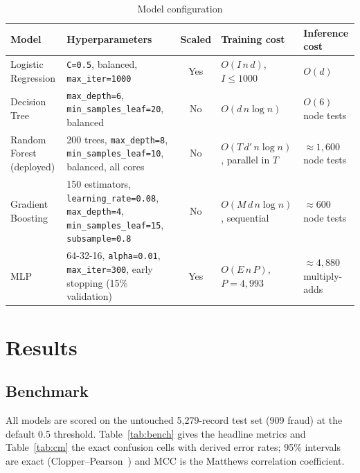 \documentclass[conference]{IEEEtran}
\newcommand{\tabfont}{\footnotesize}
\begin{document}
\begin{table}[!t]
\caption{Model configuration}\label{tab:models}
\centering\tabfont
\begin{tabularx}{\textwidth}{@{}l Y c Y Y@{}}
\toprule
\textbf{Model} & \textbf{Hyperparameters} & \textbf{Scaled} & \textbf{Training cost} & \textbf{Inference cost}\\
\midrule
Logistic Regression & \texttt{C=0.5}, balanced, \texttt{max\_\allowbreak{}iter=1000} & Yes & $O(I\,n\,d)$, $I\le1000$ & $O(d)$\\
Decision Tree & \texttt{max\_\allowbreak{}depth=6}, \texttt{min\_\allowbreak{}samples\_\allowbreak{}leaf=20}, balanced & No & $O(d\,n\log n)$ & $O(6)$ node tests\\
Random Forest (deployed) & 200 trees, \texttt{max\_\allowbreak{}depth=8}, \texttt{min\_\allowbreak{}samples\_\allowbreak{}leaf=10}, balanced, all cores & No & $O(T\,d'\,n\log n)$, parallel in $T$ & $\approx1{,}600$ node tests\\
Gradient Boosting & 150 estimators, \texttt{learning\_\allowbreak{}rate=0.08}, \texttt{max\_\allowbreak{}depth=4}, \texttt{min\_\allowbreak{}samples\_\allowbreak{}leaf=15}, \texttt{subsample=0.8} & No & $O(M\,d\,n\log n)$, sequential & $\approx600$ node tests\\
MLP & 64-32-16, \texttt{alpha=0.01}, \texttt{max\_\allowbreak{}iter=300}, early stopping (15\% validation) & Yes & $O(E\,n\,P)$, $P=4{,}993$ & $\approx4{,}880$ multiply-adds\\
\bottomrule
\end{tabularx}
\end{table}

\section{Results}
\subsection{Benchmark}
All models are scored on the untouched 5,279-record test set (909 fraud) at the default 0.5 threshold. Table~\ref{tab:bench} gives the headline metrics and Table~\ref{tab:cm} the exact confusion cells with derived error rates; 95\% intervals are exact (Clopper--Pearson~\cite{clopper34}) and MCC is the Matthews correlation coefficient.
\end{document}

